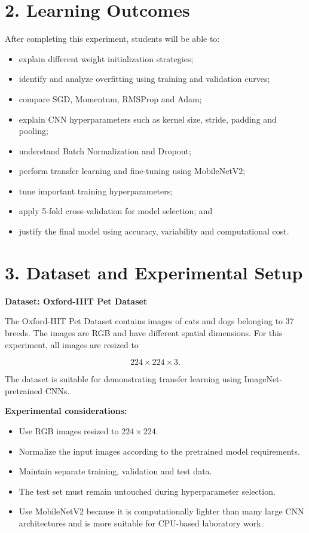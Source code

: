 \documentclass[10pt]{article}
\begin{document}
\section*{2. Learning Outcomes}

After completing this experiment, students will be able to:

\begin{itemize}
\item explain different weight initialization strategies;
\item identify and analyze overfitting using training and validation curves;
\item compare SGD, Momentum, RMSProp and Adam;
\item explain CNN hyperparameters such as kernel size, stride, padding and pooling;
\item understand Batch Normalization and Dropout;
\item perform transfer learning and fine-tuning using MobileNetV2;
\item tune important training hyperparameters;
\item apply 5-fold cross-validation for model selection; and
\item justify the final model using accuracy, variability and computational cost.
\end{itemize}

\section*{3. Dataset and Experimental Setup}

\textbf{Dataset: Oxford-IIIT Pet Dataset}

The Oxford-IIIT Pet Dataset contains images of cats and dogs belonging
to 37 breeds. The images are RGB and have different spatial dimensions.
For this experiment, all images are resized to

\[
224\times224\times3.
\]

The dataset is suitable for demonstrating transfer learning using
ImageNet-pretrained CNNs.

\textbf{Experimental considerations:}

\begin{itemize}
\item Use RGB images resized to $224\times224$.
\item Normalize the input images according to the pretrained model requirements.
\item Maintain separate training, validation and test data.
\item The test set must remain untouched during hyperparameter selection.
\item Use MobileNetV2 because it is computationally lighter than many
large CNN architectures and is more suitable for CPU-based laboratory work.
\end{itemize}
\end{document}
